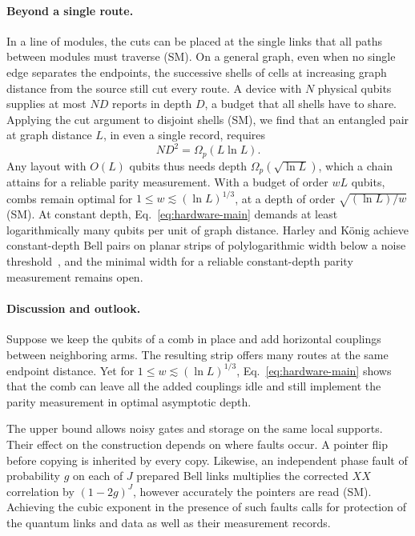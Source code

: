 \documentclass[aps,prl,twocolumn,superscriptaddress,longbibliography,reprint,floatfix]{revtex4-2}
\begin{document}
\smallskip
\paragraph*{Beyond a single route.}
In a line of modules, the cuts can be placed at the single links that all paths between modules must traverse (SM). On a general graph, even when no single edge separates the endpoints, the successive shells of cells at increasing graph distance from the source still cut every route. A device with $N$ physical qubits supplies at most $ND$ reports in depth $D$, a budget that all shells have to share. Applying the cut argument to disjoint shells (SM), we find that an entangled pair at graph distance $L$, in even a single record, requires
\begin{equation}
 ND^2=\Omega_p\!\left(L\ln L\right).
 \label{eq:hardware-main}
\end{equation}
Any layout with $O(L)$ qubits thus needs depth $\Omega_p(\sqrt{\ln L})$, which a chain attains for a reliable parity measurement. With a budget of order $wL$ qubits, combs remain optimal for $1\le w\lesssim(\ln L)^{1/3}$, at a depth of order $\sqrt{(\ln L)/w}$ (SM). At constant depth, Eq.~\eqref{eq:hardware-main} demands at least logarithmically many qubits per unit of graph distance. Harley and K\"onig achieve constant-depth Bell pairs on planar strips of polylogarithmic width below a noise threshold~\cite{Harley2026}, and the minimal width for a reliable constant-depth parity measurement remains open.

\smallskip
\paragraph*{Discussion and outlook.}
Suppose we keep the qubits of a comb in place and add horizontal couplings between neighboring arms. The resulting strip offers many routes at the same endpoint distance. Yet for $1\le w\lesssim(\ln L)^{1/3}$, Eq.~\eqref{eq:hardware-main} shows that the comb can leave all the added couplings idle and still implement the parity measurement in optimal asymptotic depth.

The upper bound allows noisy gates and storage on the same local supports. Their effect on the construction depends on where faults occur. A pointer flip before copying is inherited by every copy. Likewise, an independent phase fault of probability $g$ on each of $J$ prepared Bell links multiplies the corrected $XX$ correlation by $(1-2g)^J$, however accurately the pointers are read (SM). Achieving the cubic exponent in the presence of such faults calls for protection of the quantum links and data as well as their measurement records.
\end{document}
